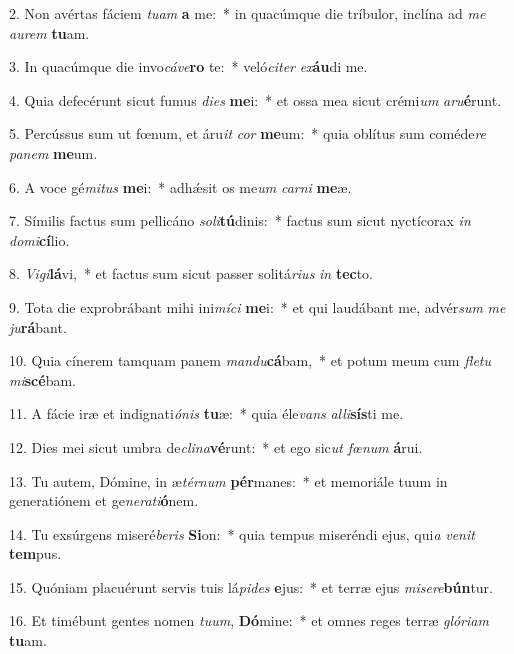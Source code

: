 2. Non avértas fáciem \textit{tu}\textit{am} \textbf{a} me:~*  in quacúmque die tríbulor, inclína ad \textit{me} \textit{au}\textit{rem} \textbf{tu}am.\

3. In quacúmque die invo\textit{cá}\textit{ve}\textbf{ro} te:~*  veló\textit{ci}\textit{ter} \textit{ex}\textbf{áu}di me.\

4. Quia defecérunt sicut fumus \textit{di}\textit{es} \textbf{me}i:~*  et ossa mea sicut crémi\textit{um} \textit{a}\textit{ru}\textbf{é}runt.\

5. Percússus sum ut fœnum, et áru\textit{it} \textit{cor} \textbf{me}um:~*  quia oblítus sum coméde\textit{re} \textit{pa}\textit{nem} \textbf{me}um.\

6. A voce gé\textit{mi}\textit{tus} \textbf{me}i:~*  adhǽsit os me\textit{um} \textit{car}\textit{ni} \textbf{me}æ.\

7. Símilis factus sum pellicáno \textit{so}\textit{li}\textbf{tú}dinis:~*  factus sum sicut nyctícorax \textit{in} \textit{do}\textit{mi}\textbf{cí}lio.\

8. \textit{Vi}\textit{gi}\textbf{lá}vi,~*  et factus sum sicut passer solitá\textit{ri}\textit{us} \textit{in} \textbf{tec}to.\

9. Tota die exprobrábant mihi ini\textit{mí}\textit{ci} \textbf{me}i:~*  et qui laudábant me, advér\textit{sum} \textit{me} \textit{ju}\textbf{rá}bant.\

10. Quia cínerem tamquam panem \textit{man}\textit{du}\textbf{cá}bam,~*  et potum meum cum \textit{fle}\textit{tu} \textit{mi}\textbf{scé}bam.\

11. A fácie iræ et indignati\textit{ó}\textit{nis} \textbf{tu}æ:~*  quia éle\textit{vans} \textit{al}\textit{li}\textbf{sís}ti me.\

12. Dies mei sicut umbra de\textit{cli}\textit{na}\textbf{vé}runt:~*  et ego sic\textit{ut} \textit{fœ}\textit{num} \textbf{á}rui.\

13. Tu autem, Dómine, in æ\textit{tér}\textit{num} \textbf{pér}manes:~*  et memoriále tuum in generatiónem et ge\textit{ne}\textit{ra}\textit{ti}\textbf{ó}nem.\

14. Tu exsúrgens miseré\textit{be}\textit{ris} \textbf{Si}on:~*  quia tempus miseréndi ejus, qui\textit{a} \textit{ve}\textit{nit} \textbf{tem}pus.\

15. Quóniam placuérunt servis tuis lá\textit{pi}\textit{des} \textbf{e}jus:~*  et terræ ejus \textit{mi}\textit{se}\textit{re}\textbf{bún}tur.\

16. Et timébunt gentes nomen \textit{tu}\textit{um}, \textbf{Dó}mine:~*  et omnes reges terræ \textit{gló}\textit{ri}\textit{am} \textbf{tu}am.\

